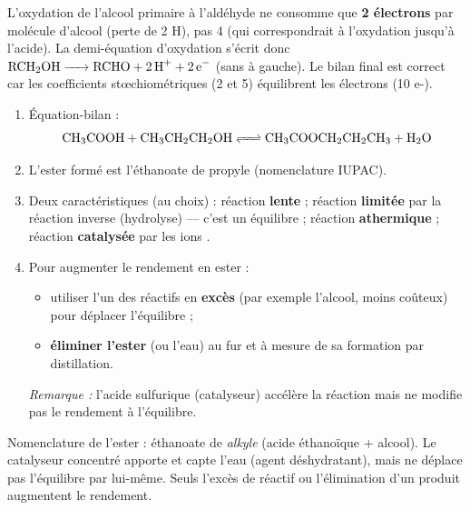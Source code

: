\documentclass[11pt]{article}
\newcommand{\cle}[1]{{\popxbold\color{popdark}#1}}
\begin{document}
\begin{attention}
L'oxydation de l'alcool primaire à l'aldéhyde ne consomme que \textbf{2 électrons} par molécule d'alcool (perte de 2 H), pas 4 (qui correspondrait à l'oxydation jusqu'à l'acide). La demi-équation d'oxydation s'écrit donc $\ce{RCH2OH -> RCHO + 2H+ + 2e-}$ (sans  à gauche). Le bilan final est correct car les coefficients stœchiométriques (2 et 5) équilibrent les électrons (10 e-).
\end{attention}

\begin{corrige}
\begin{enumerate}
  \item Équation-bilan :
  \[ \ce{CH3COOH + CH3CH2CH2OH <=> CH3COOCH2CH2CH3 + H2O} \]
  \item L'ester formé est l'\cle{éthanoate de propyle} (nomenclature IUPAC).
  \item Deux caractéristiques (au choix) : réaction \textbf{lente} ; réaction \textbf{limitée} par la réaction inverse (hydrolyse) — c'est un équilibre ; réaction \textbf{athermique} ; réaction \textbf{catalysée} par les ions .
  \item Pour augmenter le rendement en ester :
  \begin{itemize}
    \item utiliser l'un des réactifs en \textbf{excès} (par exemple l'alcool, moins coûteux) pour déplacer l'équilibre ;
    \item \textbf{éliminer l'ester} (ou l'eau) au fur et à mesure de sa formation par distillation.
  \end{itemize}
  \emph{Remarque :} l'acide sulfurique (catalyseur) accélère la réaction mais ne modifie pas le rendement à l'équilibre.
\end{enumerate}
\end{corrige}

\begin{attention}
Nomenclature de l'ester : \og éthanoate de \textit{alkyle} \fg{} (acide éthanoïque + alcool). Le catalyseur  concentré apporte  et capte l'eau (agent déshydratant), mais ne déplace pas l'équilibre par lui-même. Seuls l'excès de réactif ou l'élimination d'un produit augmentent le rendement.
\end{attention}
\end{document}
